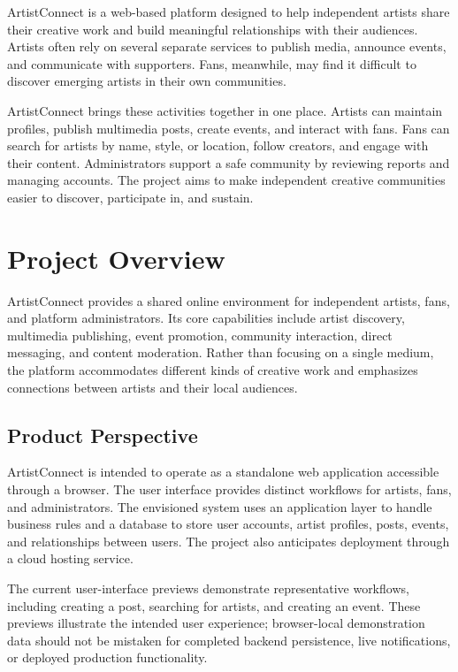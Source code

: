 \documentclass[11pt]{report}
\begin{document}
ArtistConnect is a web-based platform designed to help independent artists share their creative work and build meaningful relationships with their audiences. Artists often rely on several separate services to publish media, announce events, and communicate with supporters. Fans, meanwhile, may find it difficult to discover emerging artists in their own communities.

ArtistConnect brings these activities together in one place. Artists can maintain profiles, publish multimedia posts, create events, and interact with fans. Fans can search for artists by name, style, or location, follow creators, and engage with their content. Administrators support a safe community by reviewing reports and managing accounts. The project aims to make independent creative communities easier to discover, participate in, and sustain.

\chapter{Project Overview}

ArtistConnect provides a shared online environment for independent artists, fans, and platform administrators. Its core capabilities include artist discovery, multimedia publishing, event promotion, community interaction, direct messaging, and content moderation. Rather than focusing on a single medium, the platform accommodates different kinds of creative work and emphasizes connections between artists and their local audiences.

\section{Product Perspective}

ArtistConnect is intended to operate as a standalone web application accessible through a browser. The user interface provides distinct workflows for artists, fans, and administrators. The envisioned system uses an application layer to handle business rules and a database to store user accounts, artist profiles, posts, events, and relationships between users. The project also anticipates deployment through a cloud hosting service.

The current user-interface previews demonstrate representative workflows, including creating a post, searching for artists, and creating an event. These previews illustrate the intended user experience; browser-local demonstration data should not be mistaken for completed backend persistence, live notifications, or deployed production functionality.
\end{document}

